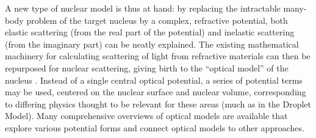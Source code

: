 A new type of nuclear model is thus at hand:
by replacing the intractable many-body problem
of the target nucleus by a complex, refractive potential, both elastic scattering (from the real 
part of the potential) and inelastic scattering (from the imaginary part) can be neatly 
explained. The existing mathematical machinery for calculating scattering of light from
refractive materials can then be repurposed for nuclear scattering, giving birth to
the ``optical model'' of the nucleus \cite{Feshbach1958, McVoy1967}.
Instead of a single central \gls{optical potential}, a series
of potential terms may be used,
centered on the nuclear surface and nuclear volume,
corresponding to differing physics thought to be relevant for these areas (much
as in the Droplet Model). Many comprehensive overviews of optical models are
available \cite{Dickhoff2018, Hodgson1971} that explore various potential forms
and connect optical models to other approaches.

